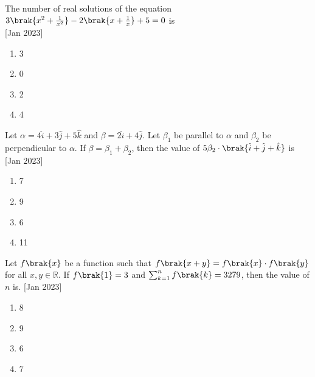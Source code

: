  \item{
    	
	    	The number of real solutions of the equation $3\brak{x^2 + \frac{1}{x^2}} - 2\brak{x + \frac{1}{x}}+5 =0$ is\\
	    	\text{   }\hfill
	    	{[Jan 2023]}
	    	\begin{multicols}{4}
	    		\begin{enumerate}
	    			\item 3
	    			\item 0
	    			\item 2
	    			\item 4
	    		\end{enumerate}
	    	\end{multicols}
	    	
	    }
    \item{
	
		    Let
		    $\alpha = 4\hat{i} + 3\hat{j} + 5\hat{k}$
		    and
		    $\beta = 2\hat{i} + 4\hat{j}$.
		    Let
		    $\beta_1$
		    be
		    parallel to
		    $\alpha$
		    and
		    $\beta_2$
		    be perpendicular to
		    $\alpha$.
		    If
		    $\beta = \beta_1 + \beta_2$,
		    then the value of
		    $5\beta_2\cdot\brak{\hat{i} + \hat{j} + \hat{k}}$
		    is
			\text{   }\hfill
			{[Jan 2023]}
			\begin{multicols}{4}
				\begin{enumerate}
						\item 7
						\item 9
						\item 6
						\item 11
				\end{enumerate}
			\end{multicols}
			
		}

    \item{
        
            Let $f\brak{x}$ be a function such that $f\brak{x+y} = f\brak{x}\cdot f\brak{y}$ for all $x, y \in \mathbb{R}$. If $f\brak{1} = 3$ and $\sum_{k=1}^{n} f\brak{k} = 3279$, then the value of $n$ is.\text{ }
             \hfill
              {[Jan 2023]}
			\begin{multicols}{2}              
	              		\begin{enumerate}
	              			\item 8
	              			\item 9
	              			\item 6
	              			\item 7
	              	\end{enumerate}
  			\end{multicols}      
        }




